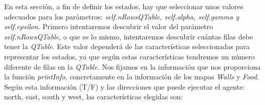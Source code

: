 \documentclass[11pt]{exam}
\begin{document}
En esta sección, a fin de definir los estados, hay que seleccionar unos valores adecuados para los parámetros: \textit{self.nRowsQTable, self.alpha, self.gamma y self.epsilon}. Primero intentaremos descubrir el valor del parámetro \textit{self.nRowsQTable}, o que es lo mismo, intentaremos descubrir cuántas filas debe tener la \textit{QTable}. Este valor dependerá de las características seleccionadas para representar los estados, ya que según estas características tendremos un número diferente de filas en la \textit{QTable}. Nos fijamos en la información que nos proporciona la función \textit{printInfo}, concretamente en la información de los mapas \textit{Walls} y \textit{Food}. Según esta información (T/F) y las direcciones que puede ejecutar el agente: north, east, south y west, las características elegidas son:

\begin{parcolumns}{2}
	\colplacechunks
\end{parcolumns}
\vspace*{3mm}
\end{document}
